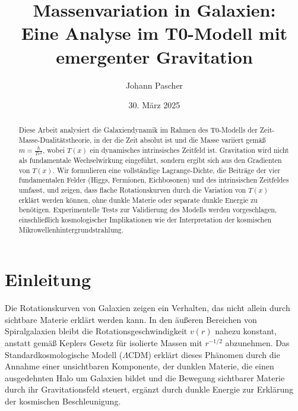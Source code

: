 \documentclass[12pt,a4paper]{article}
\title{Massenvariation in Galaxien: \\Eine Analyse im T0-Modell mit emergenter Gravitation}
\author{Johann Pascher}
\date{30. März 2025}
\newcommand{\Tfield}{T(x)}
\begin{document}
	
	\maketitle
	
	\begin{abstract}
		Diese Arbeit analysiert die Galaxiendynamik im Rahmen des T0-Modells der Zeit-Masse-Dualitätstheorie, in der die Zeit absolut ist und die Masse variiert gemäß \( m = \frac{\hbar}{T c^2} \), wobei \( \Tfield \) ein dynamisches intrinsisches Zeitfeld ist. Gravitation wird nicht als fundamentale Wechselwirkung eingeführt, sondern ergibt sich aus den Gradienten von \( \Tfield \). Wir formulieren eine vollständige Lagrange-Dichte, die Beiträge der vier fundamentalen Felder (Higgs, Fermionen, Eichbosonen) und des intrinsischen Zeitfeldes umfasst, und zeigen, dass flache Rotationskurven durch die Variation von \( \Tfield \) erklärt werden können, ohne dunkle Materie oder separate dunkle Energie zu benötigen. Experimentelle Tests zur Validierung des Modells werden vorgeschlagen, einschließlich kosmologischer Implikationen wie der Interpretation der kosmischen Mikrowellenhintergrundstrahlung.
	\end{abstract}
	
	\tableofcontents
	\newpage
	
	\section{Einleitung}
	Die Rotationskurven von Galaxien zeigen ein Verhalten, das nicht allein durch sichtbare Materie erklärt werden kann. In den äußeren Bereichen von Spiralgalaxien bleibt die Rotationsgeschwindigkeit \( v(r) \) nahezu konstant, anstatt gemäß Keplers Gesetz für isolierte Massen mit \( r^{-1/2} \) abzunehmen. Das Standardkosmologische Modell (\(\Lambda\)CDM) erklärt dieses Phänomen durch die Annahme einer unsichtbaren Komponente, der dunklen Materie, die einen ausgedehnten Halo um Galaxien bildet und die Bewegung sichtbarer Materie durch ihr Gravitationsfeld steuert, ergänzt durch dunkle Energie zur Erklärung der kosmischen Beschleunigung.
	
\end{document}
